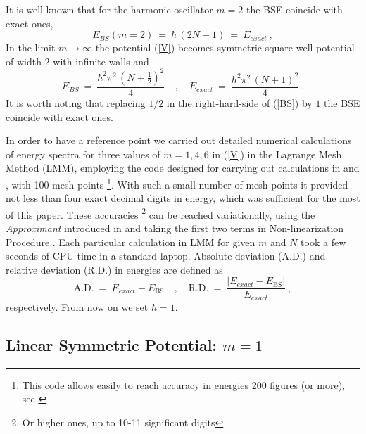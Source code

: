 \documentclass[preprint,preprintnumbers,amsmath,amssymb]{revtex4}
\newcommand{\rar}{\rightarrow}
\begin{document}
It is well known that
for the harmonic oscillator $m=2$ the BSE coincide with exact ones,
\begin{equation}
\label{EBSm=2}
		E_{BS}(m=2)\ =\ {\hbar}\,\left(2N+1\right)\ =\ E_{exact}\ ,
\end{equation}
In the limit $m \rar \infty$ the potential (\ref{V}) becomes symmetric square-well potential of width 2 with infinite walls and
\begin{equation}
\label{EBSm=infty}
   E_{BS}\     =\ \frac{\hbar^2 \pi^2\,(N+\tfrac{1}{2})^2}{4}\quad ,\quad
   E_{exact}\ =\ \frac{\hbar^2 \pi^2\,(N+1)^2}{4} \ .
\end{equation}
It is worth noting that replacing $1/2$ in the right-hard-side of (\ref{BS}) by $1$ the BSE coincide with exact ones.

In order to have a reference point we carried out detailed numerical calculations of energy spectra for three values of $m=1,4,6$ in (\ref{V}) in the Lagrange Mesh Method (LMM), employing the code designed for carrying out calculations in \cite{Tur-delValle:2021} and \cite{delValle}, with 100 mesh points \footnote{This code allows easily to reach accuracy in energies 200 figures (or more), see \cite{Tur-delValle:2021}}. With such a small number of mesh points it provided not less than four exact decimal digits in energy, which was sufficient for the most of this paper. These accuracies \footnote{Or higher ones, up to 10-11 significant digits} can be reached variationally, using the {\it Approximant} introduced in \cite{delValle} and taking the first two terms in Non-linearization Procedure \cite{Turbiner:1980-4}. Each particular calculation in LMM for given $m$ and $N$ took a few seconds of CPU time in a standard laptop.
Absolute deviation (A.D.) and relative deviation (R.D.) in energies are defined as
\begin{equation}
\label{A+R.D}
\text{A.D.}\ =\ E_{exact}-E_{\text{BS}}\quad ,\quad \text{R.D.}\ =\  \frac{\left|E_{exact}-E_{\text{BS}}\right|}{E_{exact}}	\ ,
\end{equation}
respectively. From now on we set $\hbar=1$.

\subsection*{Linear Symmetric Potential: $m=1$}
\end{document}
